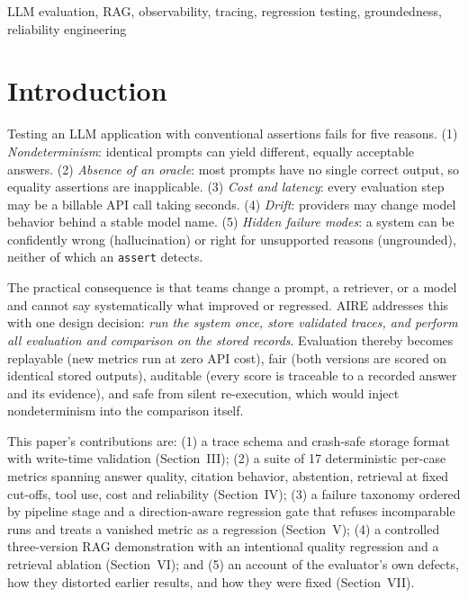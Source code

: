 \documentclass[conference]{IEEEtran}
\begin{document}
\begin{IEEEkeywords}
LLM evaluation, RAG, observability, tracing, regression testing, groundedness, reliability engineering
\end{IEEEkeywords}

\section{Introduction}
Testing an LLM application with conventional assertions fails for five
reasons. (1) \emph{Nondeterminism}: identical prompts can yield different,
equally acceptable answers. (2) \emph{Absence of an oracle}: most prompts
have no single correct output, so equality assertions are inapplicable.
(3) \emph{Cost and latency}: every evaluation step may be a billable API
call taking seconds. (4) \emph{Drift}: providers may change model behavior
behind a stable model name. (5) \emph{Hidden failure modes}: a system can be
confidently wrong (hallucination) or right for unsupported reasons
(ungrounded), neither of which an \texttt{assert} detects.

The practical consequence is that teams change a prompt, a retriever, or a
model and cannot say systematically what improved or regressed. AIRE
addresses this with one design decision: \emph{run the system once, store
validated traces, and perform all evaluation and comparison on the stored
records}. Evaluation thereby becomes replayable (new metrics run at zero
API cost), fair (both versions are scored on identical stored outputs),
auditable (every score is traceable to a recorded answer and its evidence),
and safe from silent re-execution, which would inject nondeterminism into
the comparison itself.

This paper's contributions are: (1) a trace schema and crash-safe storage
format with write-time validation (Section~III); (2) a suite of 17
deterministic per-case metrics spanning answer quality, citation behavior,
abstention, retrieval at fixed cut-offs, tool use, cost and reliability
(Section~IV); (3) a failure taxonomy ordered by pipeline stage and a
direction-aware regression gate that refuses incomparable runs and treats a
vanished metric as a regression (Section~V); (4) a controlled three-version
RAG demonstration with an intentional quality regression and a retrieval
ablation (Section~VI); and (5) an account of the evaluator's own defects,
how they distorted earlier results, and how they were fixed (Section~VII).
\end{document}
